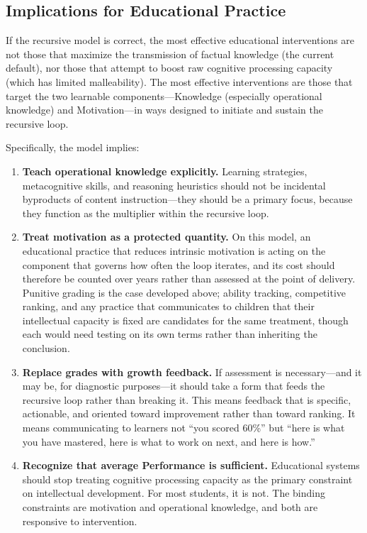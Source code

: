 \documentclass[12pt,a4paper]{article}
\begin{document}
\subsection{Implications for Educational Practice}

If the recursive model is correct, the most effective educational interventions are not those that maximize the transmission of factual knowledge (the current default), nor those that attempt to boost raw cognitive processing capacity (which has limited malleability). The most effective interventions are those that target the two learnable components---\hspace{0pt}Knowledge (especially operational knowledge) and Motivation---\hspace{0pt}in ways designed to initiate and sustain the recursive loop.

Specifically, the model implies:

\begin{enumerate}
\item \textbf{Teach operational knowledge explicitly.} Learning strategies, metacognitive skills, and reasoning heuristics should not be incidental byproducts of content instruction---\hspace{0pt}they should be a primary focus, because they function as the multiplier within the recursive loop.

\item \textbf{Treat motivation as a protected quantity.} On this model, an educational practice that reduces intrinsic motivation is acting on the component that governs how often the loop iterates, and its cost should therefore be counted over years rather than assessed at the point of delivery. Punitive grading is the case developed above; ability tracking, competitive ranking, and any practice that communicates to children that their intellectual capacity is fixed are candidates for the same treatment, though each would need testing on its own terms rather than inheriting the conclusion.

\item \textbf{Replace grades with growth feedback.} If assessment is necessary---\hspace{0pt}and it may be, for diagnostic purposes---\hspace{0pt}it should take a form that feeds the recursive loop rather than breaking it. This means feedback that is specific, actionable, and oriented toward improvement rather than toward ranking. It means communicating to learners not ``you scored 60\%'' but ``here is what you have mastered, here is what to work on next, and here is how.''

\item \textbf{Recognize that average Performance is sufficient.} Educational systems should stop treating cognitive processing capacity as the primary constraint on intellectual development. For most students, it is not. The binding constraints are motivation and operational knowledge, and both are responsive to intervention.
\end{enumerate}
\end{document}

